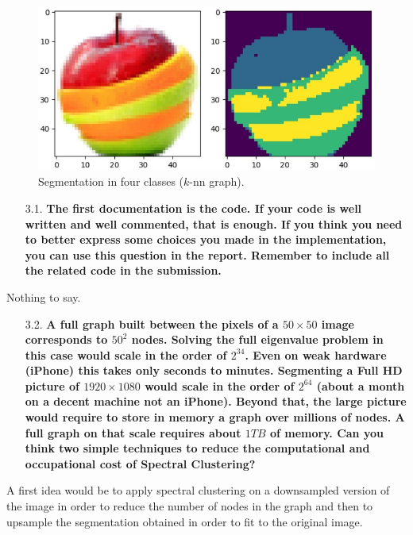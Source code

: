 \documentclass[a4paper, 11pt]{article}
\begin{document}
    \begin{figure}[!ht]
        \centering
        \includegraphics[scale=0.65]{images/fruit_salad_segmentation.jpg}
        \caption{Segmentation in four classes ($k$-nn graph).}
        \label{fig:fruit-salad-segmentation}
    \end{figure}


\begin{itemize}
    \item[3.1.] \textbf{The first documentation is the code. If your code is well written and well commented, that is enough. If you think you need to better express some choices you made in the implementation, you can use this question in the report. Remember to include all the related code in the submission.}
\end{itemize}
    
    Nothing to say.
    
\begin{itemize}
    \item[3.2.] \textbf{A full graph built between the pixels of a $50 \times 50$ image corresponds to $50^{2}$ nodes. Solving the full eigenvalue problem in this case would scale in the order of $2^{34}$. Even on weak hardware (\ie iPhone) this takes only seconds to minutes. Segmenting a Full HD picture of $1920 \times 1080$ would scale in the order of $2^{64}$ (about a month on a decent machine \ie not an iPhone). Beyond that, the large picture would require to store in memory a graph over millions of nodes. A full graph on that scale requires about $1 TB$ of memory. Can you think two simple techniques to reduce the computational and occupational cost of Spectral Clustering?}
\end{itemize}
    
    A first idea would be to apply spectral clustering on a downsampled version of the image in order to reduce the number of nodes in the graph and then to upsample the segmentation obtained in order to fit to the original image.
    
\end{document}
